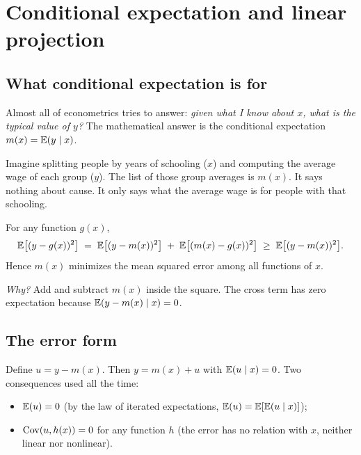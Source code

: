 \chapter{Conditional expectation and linear projection}
\label{cap:ec}

\section{What conditional expectation is for}
Almost all of econometrics tries to answer: \emph{given what I know about $x$, what is the typical value of $y$?} The mathematical answer is the conditional expectation $m(x)=\mathbb{E}(y\mid x)$.

\begin{intuicao}
Imagine splitting people by years of schooling ($x$) and computing the average wage of each group ($y$). The list of those group averages is $m(x)$. It says nothing about cause. It only says what the average wage is for people with that schooling.
\end{intuicao}

\begin{resultado}
For any function $g(x)$,
\[
\mathbb{E}\big[(y-g(x))^2\big] \;=\; \mathbb{E}\big[(y-m(x))^2\big] \;+\; \mathbb{E}\big[(m(x)-g(x))^2\big] \;\ge\; \mathbb{E}\big[(y-m(x))^2\big].
\]
Hence $m(x)$ minimizes the mean squared error among all functions of $x$.
\end{resultado}
\emph{Why?} Add and subtract $m(x)$ inside the square. The cross term has zero expectation because $\mathbb{E}(y-m(x)\mid x)=0$.

\section{The error form}
Define $u = y - m(x)$. Then $y=m(x)+u$ with $\mathbb{E}(u\mid x)=0$. Two consequences used all the time:
\begin{itemize}[leftmargin=1.4em]
\item $\mathbb{E}(u)=0$ (by the law of iterated expectations, $\mathbb{E}(u)=\mathbb{E}[\mathbb{E}(u\mid x)]$);
\item $\operatorname{Cov}(u,h(x))=0$ for any function $h$ (the error has no relation with $x$, neither linear nor nonlinear).
\end{itemize}

